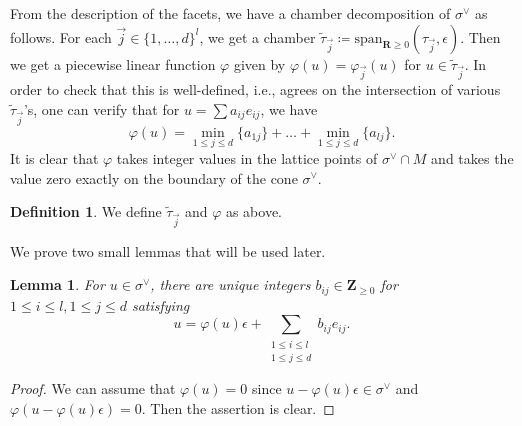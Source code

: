 \documentclass[letterpaper,11pt]{amsart}
\theoremstyle{plain}
\newtheorem{lemm}[theo]{Lemma}
\theoremstyle{definition}
\newtheorem{defi}[theo]{Definition}
\theoremstyle{remark}
\newcommand{\eps}{\epsilon}
\newcommand{\RR}{\mathbf{R}}
\newcommand{\ZZ}{\mathbf{Z}}
\newcommand{\dual}{^{\vee}}
\begin{document}
    From the description of the facets, we have a chamber decomposition of $\sigma\dual$ as follows. For each $\vec{j} \in \{ 1, \ldots, d\}^{l}$, we get a chamber $\widetilde{\tau}_{\vec{j}} \coloneqq \mathrm{span}_{\RR \geq 0}(\tau_{\vec{j}}, \eps)$. Then we get a piecewise linear function $\varphi$ given by $\varphi(u) = \varphi_{\vec{j}}(u)$ for $u \in \widetilde{\tau}_{\vec{j}}$. In order to check that this is well-defined, i.e., agrees on the intersection of various $\widetilde{\tau}_{\vec{j}}$'s, one can verify that for $u = \sum a_{ij} e_{ij}$, we have
    $$ \varphi(u) = \min_{1 \leq j \leq d} \{ a_{1j} \} + \ldots + \min_{1 \leq j \leq d} \{ a_{lj} \}.$$
    It is clear that $\varphi$ takes integer values in the lattice points of $\sigma\dual \cap M$ and takes the value zero exactly on the boundary of the cone $\sigma\dual$.
    \begin{defi}
        We define $\widetilde{\tau}_{\vec{j}}$ and $\varphi$ as above.
    \end{defi}
    We prove two small lemmas that will be used later.
    \begin{lemm} \label{lemm:decomposition-of-character}
        For $u \in \sigma\dual$, there are unique integers $b_{ij} \in \ZZ_{\geq 0}$ for $1 \leq i \leq l, 1 \leq j \leq d$ satisfying
        $$ u = \varphi(u) \eps + \sum_{\substack{1 \leq i \leq l \\ 1 \leq j \leq d}} b_{ij} e_{ij}.$$
    \end{lemm}
    \begin{proof}
        We can assume that $\varphi(u) = 0$ since $u - \varphi(u) \eps \in \sigma\dual$ and $\varphi(u - \varphi(u)\eps) = 0$. Then the assertion is clear.
    \end{proof}
\end{document}
